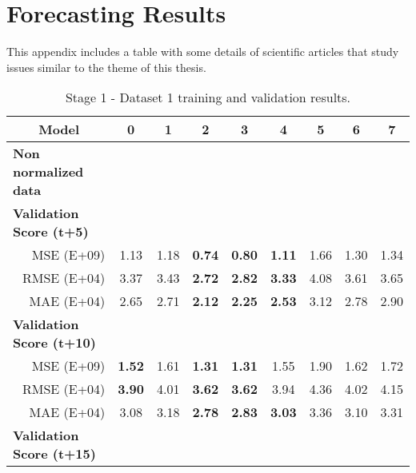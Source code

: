 \chapter{Forecasting Results}


\label{chapter:appendixD}

This appendix includes a table with some details of scientific articles that study issues similar to the theme of this thesis.



\begin{table}[htbp]
  \centering
  \caption{Stage 1 - Dataset 1 training and validation results.}
    \begin{tabular}{r|cccccccc}
        \toprule
        \multicolumn{1}{c}{\textbf{Model}} & 0     & 1     & 2     & 3     & 4     & 5     & 6     & 7 \\
        \midrule
        \multicolumn{1}{l|}{\textbf{Non normalized data}} &       &       &       &       &       &       &       &  \\
        \multicolumn{1}{l|}{\textbf{            Validation Score (t+5)      }} &       &       &       &       &       &       &       &  \\
        MSE (E+09)   & 1.13  & 1.18  & \textbf{0.74} & \textbf{0.80} & \textbf{1.11} & 1.66  & 1.30  & 1.34 \\
        RMSE (E+04)   & 3.37  & 3.43  & \textbf{2.72} & \textbf{2.82} & \textbf{3.33} & 4.08  & 3.61  & 3.65 \\
        MAE (E+04)   & 2.65  & 2.71  & \textbf{2.12} & \textbf{2.25} & \textbf{2.53} & 3.12  & 2.78  & 2.90 \\
        \multicolumn{1}{l|}{\textbf{            Validation Score (t+10)               }} &       &       &       &       &       &       &       &  \\
        MSE (E+09)   & \textbf{1.52} & 1.61  & \textbf{1.31} & \textbf{1.31} & 1.55  & 1.90  & 1.62  & 1.72 \\
        RMSE (E+04)   & \textbf{3.90} & 4.01  & \textbf{3.62} & \textbf{3.62} & 3.94  & 4.36  & 4.02  & 4.15 \\
        MAE (E+04)   & 3.08  & 3.18  & \textbf{2.78} & \textbf{2.83} & \textbf{3.03} & 3.36  & 3.10  & 3.31 \\
        \multicolumn{1}{l|}{\textbf{            Validation Score (t+15)               }} &       &       &       &       &       &       &       &  \\

\end{tabular}
\end{table}
